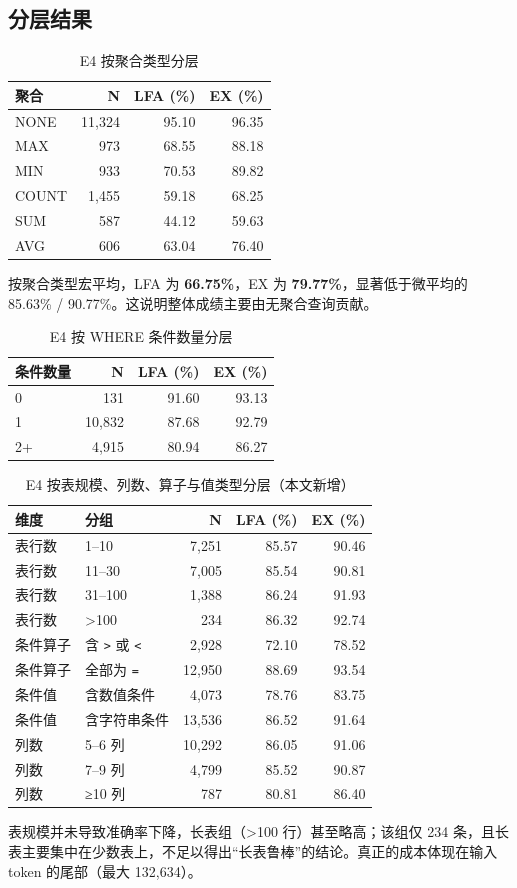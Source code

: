 \documentclass[conference]{IEEEtran}
\begin{document}
\subsection{分层结果}
\begin{table}[t]
\centering
\footnotesize
\caption{E4 按聚合类型分层}
\label{tab:t9}
\begin{tabular}{@{}lrrr@{}}
\toprule
聚合 & N & LFA (\%) & EX (\%) \\
\midrule
NONE & 11,324 & 95.10 & 96.35 \\
MAX & 973 & 68.55 & 88.18 \\
MIN & 933 & 70.53 & 89.82 \\
COUNT & 1,455 & 59.18 & 68.25 \\
SUM & 587 & 44.12 & 59.63 \\
AVG & 606 & 63.04 & 76.40 \\
\bottomrule
\end{tabular}
\end{table}
按聚合类型宏平均，LFA 为 \textbf{66.75\%}，EX 为 \textbf{79.77\%}，显著低于微平均的 85.63\% / 90.77\%。这说明整体成绩主要由无聚合查询贡献。
\begin{table}[t]
\centering
\footnotesize
\caption{E4 按 WHERE 条件数量分层}
\label{tab:t10}
\begin{tabular}{@{}lrrr@{}}
\toprule
条件数量 & N & LFA (\%) & EX (\%) \\
\midrule
0 & 131 & 91.60 & 93.13 \\
1 & 10,832 & 87.68 & 92.79 \\
2+ & 4,915 & 80.94 & 86.27 \\
\bottomrule
\end{tabular}
\end{table}
\begin{table}[t]
\centering
\footnotesize
\caption{E4 按表规模、列数、算子与值类型分层（本文新增）}
\label{tab:t11}
\begin{tabular}{@{}llrrr@{}}
\toprule
维度 & 分组 & N & LFA (\%) & EX (\%) \\
\midrule
表行数 & 1–10 & 7,251 & 85.57 & 90.46 \\
表行数 & 11–30 & 7,005 & 85.54 & 90.81 \\
表行数 & 31–100 & 1,388 & 86.24 & 91.93 \\
表行数 & \textgreater{}100 & 234 & 86.32 & 92.74 \\
条件算子 & 含 \texttt{\textgreater{}} 或 \texttt{\textless{}} & 2,928 & 72.10 & 78.52 \\
条件算子 & 全部为 \texttt{=} & 12,950 & 88.69 & 93.54 \\
条件值 & 含数值条件 & 4,073 & 78.76 & 83.75 \\
条件值 & 含字符串条件 & 13,536 & 86.52 & 91.64 \\
列数 & 5–6 列 & 10,292 & 86.05 & 91.06 \\
列数 & 7–9 列 & 4,799 & 85.52 & 90.87 \\
列数 & ≥10 列 & 787 & 80.81 & 86.40 \\
\bottomrule
\end{tabular}
\end{table}
表规模并未导致准确率下降，长表组（\textgreater{}100 行）甚至略高；该组仅 234 条，且长表主要集中在少数表上，不足以得出“长表鲁棒”的结论。真正的成本体现在输入 token 的尾部（最大 132,634）。
\end{document}
